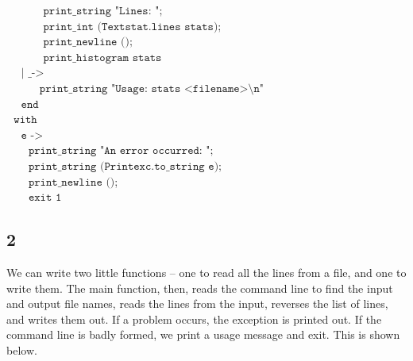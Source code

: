 \documentclass[]{book}
\begin{document}
\begin{center}
{\begin{minipage}{0.9\textwidth}
$\texttt{~~~~~~~~~~print\_string "Lines:\ ";}$\\
$\texttt{~~~~~~~~~~print\_int (Textstat.lines stats);}$\\
$\texttt{~~~~~~~~~~print\_newline ();}$\\
$\texttt{~~~~~~~~~~print\_histogram stats}$\\
$\texttt{~~~~| \_ ->}$\\
$\texttt{~~~~~~~~~print\_string "Usage:\ stats <filename>\textbackslash n"}$\\
$\texttt{~~~~end}$\\
$\texttt{~~with}$\\
$\texttt{~~~~e ->}$\\
$\texttt{~~~~~~print\_string "An error occurred:\ ";}$\\
$\texttt{~~~~~~print\_string (Printexc.to\_string e);}$\\
$\texttt{~~~~~~print\_newline ()}$;\\
$\texttt{~~~~~~exit 1}$\vphantom{g}
\end{minipage}}
\end{center}

\subsection*{2}

We can write two little functions -- one to read all the lines from a file, and one to write them. The main function, then, reads the command line to find the input and output file names, reads the lines from the input, reverses the list of lines, and writes them out. If a problem occurs, the exception is printed out. If the command line is badly formed, we print a usage message and exit. This is shown below.
\end{document}
